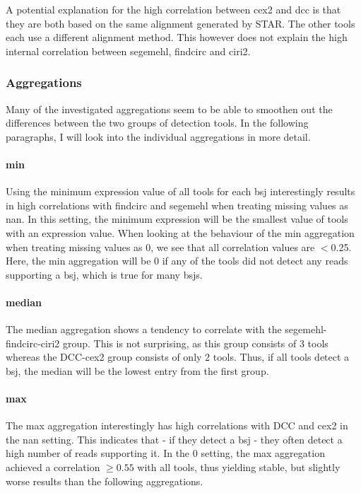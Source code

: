 A potential explanation for the high correlation between \gls{cex2} and
\gls{dcc} is that they are both based on the same alignment generated by
STAR\supercite{dobin_star_2013}.
The other tools each use a different alignment method.
This however does not explain the high internal correlation between
\gls{segemehl}, \gls{findcirc} and \gls{ciri2}.

\subsubsection{Aggregations}
Many of the investigated aggregations seem to be able to smoothen out the
differences between the two groups of detection tools.
In the following paragraphs, I will look into the individual aggregations in
more detail.

\paragraph{min}
Using the minimum expression value of all tools for each \gls{bsj}
interestingly results in high correlations with \gls{findcirc} and
\gls{segemehl} when treating missing values as \gls{nan}.
In this setting, the minimum expression will be the smallest value of tools
with an expression value.
When looking at the behaviour of the min aggregation when treating missing
values as 0, we see that all correlation values are $<$0.25.
Here, the min aggregation will be 0 if any of the tools did not detect any
reads supporting a \gls{bsj}, which is true for many \glspl{bsj}.

\paragraph{median}
The median aggregation shows a tendency to correlate with the
segemehl-\gls{findcirc}-\gls{ciri2} group.
This is not surprising, as this group consists of 3 tools whereas the
DCC-\gls{cex2} group consists of only 2 tools.
Thus, if all tools detect a \gls{bsj}, the median will be the lowest entry from
the first group.

\paragraph{max}
The max aggregation interestingly has high correlations with DCC and \gls{cex2}
in the \gls{nan} setting.
This indicates that - if they detect a \gls{bsj} - they often detect a high
number of reads supporting it.
In the 0 setting, the max aggregation achieved a correlation $\geq 0.55$ with
all tools, thus yielding stable, but slightly worse results than the following
aggregations.

